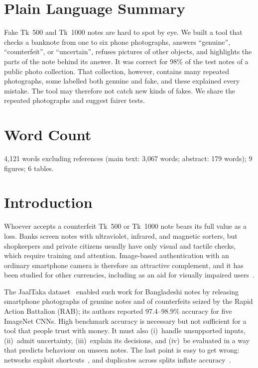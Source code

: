 \documentclass[pdflatex,iicol,sn-mathphys-num]{sn-jnl}
\begin{document}
\section*{Plain Language Summary}
Fake Tk~500 and Tk~1000 notes are hard to spot by eye. We built a tool that checks a
banknote from one to six phone photographs, answers ``genuine'', ``counterfeit'', or
``uncertain'', refuses pictures of other objects, and highlights the parts of the note
behind its answer. It was correct for 98\% of the test notes of a public photo
collection. That collection, however, contains many repeated photographs, some labelled
both genuine and fake, and these explained every mistake. The tool may therefore not
catch new kinds of fakes. We share the repeated photographs and suggest fairer tests.

\section*{Word Count}
4{,}121 words excluding references (main text: 3{,}067 words; abstract: 179 words);
9 figures; 6 tables.

\section{Introduction}\label{sec:intro}

Whoever accepts a counterfeit Tk~500 or Tk~1000 note bears its full value as a loss.
Banks screen notes with ultraviolet, infrared, and magnetic sorters, but shopkeepers and
private citizens usually have only visual and tactile checks, which require training and
attention. Image-based authentication with an ordinary smartphone camera is therefore an
attractive complement, and it has been studied for other currencies, including as an aid
for visually impaired users~\cite{pham2020,pham2022}.

The JaalTaka dataset~\cite{piyas2025jaaltaka} enabled such work for Bangladeshi notes by
releasing smartphone photographs of genuine notes and of counterfeits seized by the Rapid
Action Battalion (RAB); its authors reported 97.4--98.9\% accuracy for five ImageNet
CNNs. High benchmark accuracy is necessary but not sufficient for a tool that people
trust with money. It must also (i)~handle unsupported inputs, (ii)~admit uncertainty,
(iii)~explain its decisions, and (iv)~be evaluated in a way that predicts behaviour on
unseen notes. The last point is easy to get wrong: networks exploit
shortcuts~\cite{geirhos2020shortcut}, and duplicates across splits inflate
accuracy~\cite{kaufman2012leakage,barz2020cifair,kapoor2023leakage}.
\end{document}
